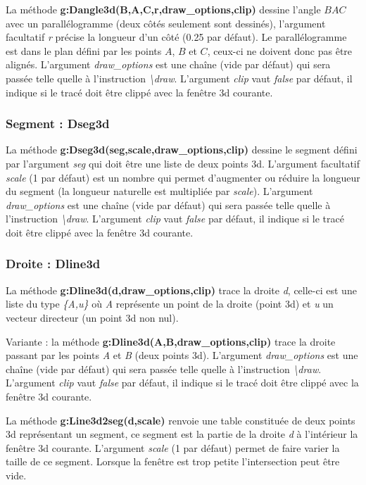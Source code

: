La méthode \textbf{g:Dangle3d(B,A,C,r,draw\_options,clip)} dessine l'angle \(BAC\) avec un parallélogramme (deux côtés seulement sont dessinés), l'argument facultatif \emph{r} précise la longueur d'un côté (0.25 par défaut). Le parallélogramme est dans le plan défini par les points $A$, $B$ et $C$, ceux-ci ne doivent donc pas être alignés. L'argument \emph{draw\_options} est une chaîne (vide par défaut) qui sera passée telle quelle à l'instruction  \emph{\textbackslash draw}. L'argument \emph{clip} vaut \emph{false} par défaut, il indique si le tracé doit être clippé avec la fenêtre 3d courante.
    
\subsubsection{Segment : Dseg3d}

La méthode \textbf{g:Dseg3d(seg,scale,draw\_options,clip)} dessine le segment défini par l'argument \emph{seg} qui doit être une liste de deux points 3d. L'argument facultatif \emph{scale} (1 par défaut) est un nombre qui permet d'augmenter ou réduire la longueur du segment (la longueur naturelle est multipliée par \emph{scale}). L'argument \emph{draw\_options} est une chaîne (vide par défaut) qui sera passée telle quelle à l'instruction \emph{\textbackslash draw}. L'argument \emph{clip} vaut \emph{false} par défaut, il indique si le tracé doit être clippé avec la fenêtre 3d courante.
    
\subsubsection{Droite : Dline3d}

La méthode \textbf{g:Dline3d(d,draw\_options,clip)} trace la droite \emph{d}, celle-ci est une liste du type \emph{\{A,u\}} où \emph{A} représente un point de la droite (point 3d) et \emph{u} un vecteur directeur (un point 3d non nul). 

Variante : la méthode \textbf{g:Dline3d(A,B,draw\_options,clip)} trace la droite passant par les points \emph{A} et \emph{B} (deux points 3d). L'argument \emph{draw\_options} est une chaîne (vide par défaut) qui sera passée telle quelle à l'instruction \emph{\textbackslash draw}. L'argument \emph{clip} vaut \emph{false} par défaut, il indique si le tracé doit être clippé avec la fenêtre 3d courante.

La méthode \textbf{g:Line3d2seg(d,scale)} renvoie une table constituée de deux points 3d représentant un segment, ce segment est la partie de la droite \emph{d} à l'intérieur la fenêtre 3d courante. L'argument \emph{scale} (1 par défaut) permet de faire varier la taille de ce segment. Lorsque la fenêtre est trop petite l'intersection peut être vide.

